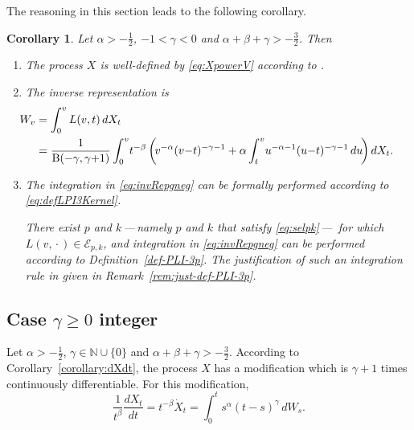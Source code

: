 \documentclass{article}
\newcommand{\dotX}{\dot{X}}
\newcommand{\vS}{v}
\theoremstyle{plain}
\newtheorem{corollary}{Corollary}
\theoremstyle{remark}
\theoremstyle{definition}
\begin{document}
The reasoning in this section leads to the following corollary.
\begin{corollary}
	Let $\alpha\mathbin{>}-\frac12$,
	${-}1\mathbin{<}\gamma\mathbin{<}0$
	and $\alpha+\beta+\gamma\mathbin{>}{-}\frac32$.
	Then
	\begin{enumerate}
		\item
			The process $X$ is well-defined by
			\eqref{eq:XpowerV}
			according to \cite[Theorem~1]{Part 1}.
		\item
			The inverse representation is
			\begin{align}
				\hspace{-20.5pt}W_v &= \int_0^v L(v,t)\, dX_t
				\nonumber \\ \hspace{-6.3pt}&=
				\frac{1}{\mathrm{B}(-\gamma, \gamma{+}1)}
				\int_0^v \! t^{-\beta}
				\left(\!\vS^{-\alpha} (\vS{-}t)^{-\gamma-1}
				+ \alpha \int_t^\vS \! u^{-\alpha-1}
				(u{-}t)^{-\gamma-1} \,du \!\right)
				dX_t .
				\label{eq:invRepgneg}
			\end{align}
		\item
			The integration in \eqref{eq:invRepgneg}
			can be formally performed according
			to \eqref{eq:defLPI3Kernel}.

			There exist $p$ and $k$\,---\,namely $p$ and $k$
			that satisfy \eqref{eq:selpk}\,---\,\allowbreak
			for which $L(v,{{}\mathbin{\cdot}{}})\allowbreak \in
			\mathcal{E}_{p,k}$, and integration
			in \eqref{eq:invRepgneg} can be performed
			according to Definition~\ref{def-PLI-3p}.
			The justification of such an integration rule
			in given in Remark~\ref{rem:just-def-PLI-3p}.
	\end{enumerate}
\end{corollary}



\subsection[Case $\gamma\ge 0$ integer]
{Case \boldmath$\gamma\ge 0$ integer}
\label{ss:invrepgammainteger}
Let $\alpha>-\frac12$, $\gamma\in\mathbb{N}\cup\{0\}$
and $\alpha+\beta+\gamma\mathbin{>}{-}\frac32$.
According to Corollary~\ref{corollary:dXdt},
the process $X$ has a modification
which is $\gamma{+}1$ times
continuously differentiable.
For this modification,
\begin{equation}\label{eq:t-bXtdt}
	\frac{1}{t^\beta} \frac{d X_t}{dt} = t^{-\beta} \dotX_t
	= \int_0^t s^\alpha (t-s)^\gamma \, dW_s .
\end{equation}
\end{document}
